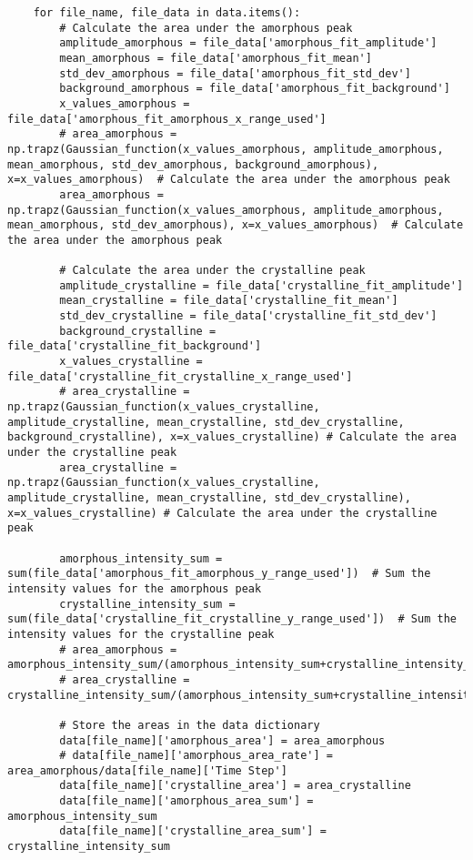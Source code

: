 \begin{small}
\begin{verbatim}
    for file_name, file_data in data.items():
        # Calculate the area under the amorphous peak
        amplitude_amorphous = file_data['amorphous_fit_amplitude']
        mean_amorphous = file_data['amorphous_fit_mean']
        std_dev_amorphous = file_data['amorphous_fit_std_dev']
        background_amorphous = file_data['amorphous_fit_background']
        x_values_amorphous = file_data['amorphous_fit_amorphous_x_range_used']
        # area_amorphous = np.trapz(Gaussian_function(x_values_amorphous, amplitude_amorphous, mean_amorphous, std_dev_amorphous, background_amorphous), x=x_values_amorphous)  # Calculate the area under the amorphous peak
        area_amorphous = np.trapz(Gaussian_function(x_values_amorphous, amplitude_amorphous, mean_amorphous, std_dev_amorphous), x=x_values_amorphous)  # Calculate the area under the amorphous peak

        # Calculate the area under the crystalline peak
        amplitude_crystalline = file_data['crystalline_fit_amplitude']
        mean_crystalline = file_data['crystalline_fit_mean']
        std_dev_crystalline = file_data['crystalline_fit_std_dev']
        background_crystalline = file_data['crystalline_fit_background']
        x_values_crystalline = file_data['crystalline_fit_crystalline_x_range_used']
        # area_crystalline = np.trapz(Gaussian_function(x_values_crystalline, amplitude_crystalline, mean_crystalline, std_dev_crystalline, background_crystalline), x=x_values_crystalline) # Calculate the area under the crystalline peak
        area_crystalline = np.trapz(Gaussian_function(x_values_crystalline, amplitude_crystalline, mean_crystalline, std_dev_crystalline), x=x_values_crystalline) # Calculate the area under the crystalline peak

        amorphous_intensity_sum = sum(file_data['amorphous_fit_amorphous_y_range_used'])  # Sum the intensity values for the amorphous peak
        crystalline_intensity_sum = sum(file_data['crystalline_fit_crystalline_y_range_used'])  # Sum the intensity values for the crystalline peak
        # area_amorphous = amorphous_intensity_sum/(amorphous_intensity_sum+crystalline_intensity_sum)
        # area_crystalline = crystalline_intensity_sum/(amorphous_intensity_sum+crystalline_intensity_sum)

        # Store the areas in the data dictionary
        data[file_name]['amorphous_area'] = area_amorphous
        # data[file_name]['amorphous_area_rate'] = area_amorphous/data[file_name]['Time Step']
        data[file_name]['crystalline_area'] = area_crystalline
        data[file_name]['amorphous_area_sum'] = amorphous_intensity_sum
        data[file_name]['crystalline_area_sum'] = crystalline_intensity_sum


\end{verbatim}
\end{small}
